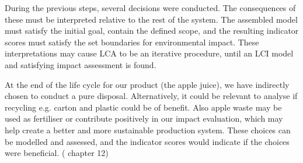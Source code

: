 During the previous steps, several decisions were conducted. The consequences of these must be interpreted relative to the rest of the system. The assembled model must satisfy the initial goal, contain the defined scope, and the resulting indicator scores must satisfy the set boundaries for environmental impact. These interpretations may cause LCA to be an iterative procedure, until an LCI model and satisfying impact assessment is found.

At the end of the life cycle for our product (the apple juice), we have indirectly chosen to conduct a pure disposal. Alternatively, it could be relevant to analyse if recycling e.g. carton and plastic could be of benefit. Also apple waste may be used as fertiliser or contribute positively in our impact evaluation, which may help create a better and more sustainable production system. These choices can be modelled and assessed, and the indicator scores would indicate if the choices were beneficial. (\cite{LCA_TheoryAndPractice} chapter 12)